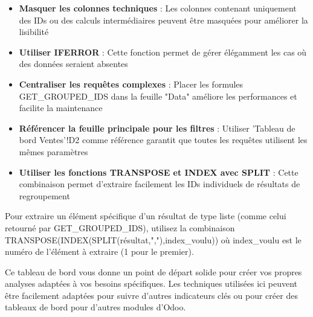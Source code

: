 \documentclass[12pt, a4paper]{article}
\begin{document}
\begin{itemize}
    \item \textbf{Masquer les colonnes techniques} : Les colonnes contenant uniquement des IDs ou des calculs intermédiaires peuvent être masquées pour améliorer la lisibilité
    \item \textbf{Utiliser IFERROR} : Cette fonction permet de gérer élégamment les cas où des données seraient absentes
    \item \textbf{Centraliser les requêtes complexes} : Placer les formules GET\_GROUPED\_IDS dans la feuille "Data" améliore les performances et facilite la maintenance
    \item \textbf{Référencer la feuille principale pour les filtres} : Utiliser 'Tableau de bord Ventes'!D2 comme référence garantit que toutes les requêtes utilisent les mêmes paramètres
    \item \textbf{Utiliser les fonctions TRANSPOSE et INDEX avec SPLIT} : Cette combinaison permet d'extraire facilement les IDs individuels de résultats de regroupement
\end{itemize}

\begin{tip}
Pour extraire un élément spécifique d'un résultat de type liste (comme celui retourné par GET\_GROUPED\_IDS), utilisez la combinaison TRANSPOSE(INDEX(SPLIT(résultat,","),index\_voulu)) où index\_voulu est le numéro de l'élément à extraire (1 pour le premier).
\end{tip}

Ce tableau de bord vous donne un point de départ solide pour créer vos propres analyses adaptées à vos besoins spécifiques. Les techniques utilisées ici peuvent être facilement adaptées pour suivre d'autres indicateurs clés ou pour créer des tableaux de bord pour d'autres modules d'Odoo.
\end{document}
